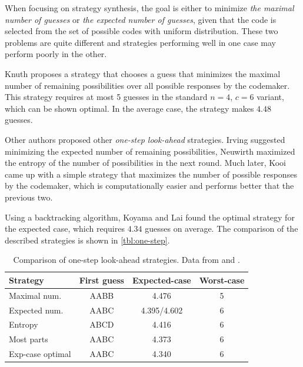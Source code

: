 When focusing on strategy synthesis, the goal is either to minimize
  \emph{the maximal number of guesses}
  or \emph{the expected number of guesses}, given that the code
  is selected from the set of possible codes with uniform distribution.
These two problems are quite different and strategies performing well
  in one case may perform poorly in the other.

Knuth\cite{mm-knuth} proposes a strategy that chooses a guess
  that minimizes the maximal number of remaining possibilities over all
  possible responses by the codemaker.
This strategy requires at most 5 guesses in the standard $n=4$, $c=6$ variant,
  which can be shown optimal.
In the average case, the strategy makes $4.48$ guesses.

Other authors proposed other \emph{one-step look-ahead} strategies.
Irving\cite{mm-expnum} suggested minimizing the expected number
  of remaining possibilities,
Neuwirth\cite{mm-entropy} maximized the entropy of the number
  of possibilities in the next round.
Much later, Kooi\cite{mm-mostparts} came up with a simple strategy that
  maximizes the number of possible responses by the codemaker,
  which is computationally easier and performs better that the previous two.

Using a backtracking algorithm, Koyama and Lai\cite{mm-exp-opt} found
  the optimal strategy for the expected case, which requires $4.34$
  guesses on average.
The comparison of the described strategies is shown in \autoref{tbl:one-step}.

\begin{table}[h]
\begin{center}
\begin{tabular}{|l|c|c|c|}
\hline Strategy & First guess & Expected-case & Worst-case \\ \hline
Maximal num. & AABB & 4.476 & 5 \\ \hline
Expected num. & AABC & 4.395/4.602\footnotemark & 6 \\ \hline
Entropy & ABCD & 4.416 & 6 \\ \hline
Most parts & AABC & 4.373 & 6 \\ \hline
Exp-case optimal & AABC & 4.340 & 6 \\ \hline
\end{tabular}
\caption{Comparison of one-step look-ahead strategies. Data from \cite{mm-ville} and \cite{mm-mostparts}.}
\label{tbl:one-step}
\end{center}
\end{table}

